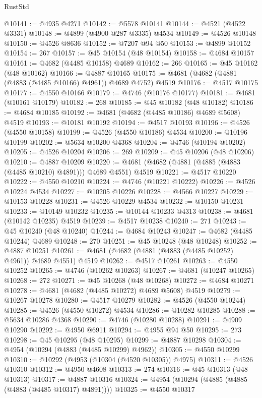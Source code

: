 \begin{lexlean}{RustStd}
\begin{coremodule}
@10141 := @4935 @4271
@10142 := @5578 @10141
@10144 := @4521 (@4522 @3331)
@10148 := @4899 (@4900 @287 @3335) @4534
@10149 := @4526 @10148
@10150 := @4526 @8636
@10152 := @7207 @94 @50
@10153 := @4899 @10152
@10154 := 267
@10157 := @45 @10154 (@48 @10154)
@10158 := @4684 @10157
@10161 := @4682 (@4485 @10158) @4689
@10162 := 266
@10165 := @45 @10162 (@48 @10162)
@10166 := @4887 @10165
@10175 := @4681 (@4682 (@4881 (@4883 (@4485 @10166) @4961)) @4689 @4752) @4519
@10176 := @4517 @10175
@10177 := @4550 @10166
@10179 := @4746 (@10176 @10177)
@10181 := @4681 (@10161 @10179)
@10182 := 268
@10185 := @45 @10182 (@48 @10182)
@10186 := @4684 @10185
@10192 := @4681 (@4682 (@4485 @10186) @4689 @5608) @4519
@10193 := @10181 @10192
@10194 := @4517 @10193
@10196 := @4526 (@4550 @10158)
@10199 := @4526 (@4550 @10186) @4534
@10200 := @10196 @10199
@10202 := @5634 @10200 @4368
@10204 := @4746 (@10194 @10202)
@10205 := @4526 @10204
@10206 := 269
@10209 := @45 @10206 (@48 @10206)
@10210 := @4887 @10209
@10220 := @4681 (@4682 (@4881 (@4885 (@4883 (@4485 @10210) @4891))) @4689 @4551) @4519
@10221 := @4517 @10220
@10222 := @4550 @10210
@10224 := @4746 (@10221 @10222)
@10226 := @4526 @10224 @4534
@10227 := @10205 @10226
@10228 := @4566 @10227
@10229 := @10153 @10228
@10231 := @4526 @10229 @4534
@10232 := @10150 @10231
@10233 := @10149 @10232
@10235 := @10144 @10233 @4313
@10238 := @4681 (@10142 @10235) @4519
@10239 := @4517 @10238
@10240 := 271
@10243 := @45 @10240 (@48 @10240)
@10244 := @4684 @10243
@10247 := @4682 (@4485 @10244) @4689
@10248 := 270
@10251 := @45 @10248 (@48 @10248)
@10252 := @4887 @10251
@10261 := @4681 (@4682 (@4881 (@4883 (@4485 @10252) @4961)) @4689 @4551) @4519
@10262 := @4517 @10261
@10263 := @4550 @10252
@10265 := @4746 (@10262 @10263)
@10267 := @4681 (@10247 @10265)
@10268 := 272
@10271 := @45 @10268 (@48 @10268)
@10272 := @4684 @10271
@10278 := @4681 (@4682 (@4485 @10272) @4689 @5608) @4519
@10279 := @10267 @10278
@10280 := @4517 @10279
@10282 := @4526 (@4550 @10244)
@10285 := @4526 (@4550 @10272) @4534
@10286 := @10282 @10285
@10288 := @5634 @10286 @4368
@10290 := @4746 (@10280 @10288)
@10291 := @4909 @10290
@10292 := @4950 @6911
@10294 := @4955 @94 @50
@10295 := 273
@10298 := @45 @10295 (@48 @10295)
@10299 := @4887 @10298
@10304 := @4954 (@10294 (@4883 (@4485 @10299) @4962))
@10305 := @4550 @10299
@10310 := @10292 (@4953 (@10304 (@4520 @10305)) @4975)
@10311 := @4526 @10310
@10312 := @4950 @4608
@10313 := 274
@10316 := @45 @10313 (@48 @10313)
@10317 := @4887 @10316
@10324 := @4954 (@10294 (@4885 (@4885 (@4883 (@4485 @10317) @4891))))
@10325 := @4550 @10317

\end{coremodule}
\end{lexlean}
